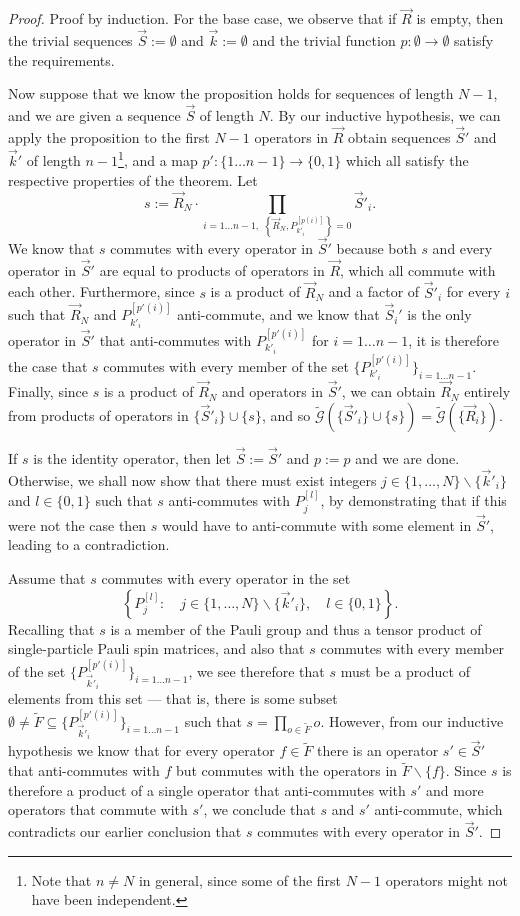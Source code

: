 \documentclass[12pt]{amsbook}
\theoremstyle{plain}
\theoremstyle{definition}
\theoremstyle{remark}
\newcommand{\lst}{\vec}
\newcommand{\set}{\tilde}
\newcommand{\genfun}{\tilde{\mathcal{G}}}
\newcommand{\paren}[1]{\left(#1\right)}
\begin{document}
\begin{proof}
Proof by induction.  For the base case, we observe that if $\lst R$ is empty, then the trivial sequences $\lst S:=\emptyset$ and $\lst k :=\emptyset$ and the trivial function $p:\emptyset\to\emptyset$ satisfy the requirements.

Now suppose that we know the proposition holds for sequences of length $N-1$, and we are given a sequence $\lst S$ of length $N$.  By our inductive hypothesis, we can apply the proposition to the first $N-1$ operators in $\lst R$ obtain sequences $\lst S'$ and $\lst k'$ of length $n-1$\footnote{Note that $n\ne N$ in general, since some of the first $N-1$ operators might not have been independent.}, and a map $p':\{1\dots n-1\}\to \{0,1\}$ which all satisfy the respective properties of the theorem.  Let $$s:=\lst R_N\cdot \prod_{i=1\dots n-1, \,\,\left\{\lst R_N,P_{k'_i}^{[p(i)]}\right\}=0} \lst S'_i.$$  We know that $s$ commutes with every operator in $\lst S'$ because both $s$ and every operator in $\lst S'$ are equal to products of operators in $\lst R$, which all commute with each other.  Furthermore, since $s$ is a product of $\lst R_N$ and a factor of $\lst S'_i$ for every $i$ such that $\lst R_N$ and $P_{k'_i}^{[p'(i)]}$ anti-commute, and we know that $\lst S_i'$ is the only operator in $\lst S'$ that anti-commutes with $P_{k'_i}^{[p'(i)]}$ for $i=1\dots n-1$, it is therefore the case that $s$ commutes with every member of the set $\{P_{k'_i}^{[p'(i)]}\}_{i=1\dots n-1}$.  Finally, since $s$ is a product of $\lst R_N$ and operators in $\lst S'$, we can obtain $\lst R_N$ entirely from products of operators in $\{\lst S'_i\} \cup \{s\}$, and so $\genfun\paren{\{\lst S'_i\} \cup \{s\}}=\genfun\paren{\{\lst R_i\}}$.

If $s$ is the identity operator, then let $\lst S:=\lst S'$ and $p:=p$ and we are done.  Otherwise, we shall now show that there must exist integers $j\in\{1,\dots,N\}\backslash\{\lst k'_i\}$ and $l\in\{0,1\}$ such that $s$ anti-commutes with $P_{j}^{[l]}$, by demonstrating that if this were not the case then $s$ would have to anti-commute with some element in $\lst S'$, leading to a contradiction.

Assume that $s$ commutes with every operator in the set $$\left\{P_j^{[l]}:\quad j\in\{1,\dots,N\}\backslash\{\lst k'_i\}, \quad l\in\{0,1\}\right\}.$$  Recalling that $s$ is a member of the Pauli group and thus a tensor product of single-particle Pauli spin matrices, and also that $s$ commutes with every member of the set $\{P_{\lst k'_i}^{[p'(i)]}\}_{i=1\dots n-1}$, we see therefore that $s$ must be a product of elements from this set --- that is, there is some subset $\emptyset \ne \set F \subseteq \{P_{\lst k'_i}^{[p'(i)]}\}_{i=1\dots n-1}$ such that $s=\prod_{o\in \set F} o$.  However, from our inductive hypothesis we know that for every operator $f\in\set F$ there is an operator $s'\in\lst S'$ that anti-commutes with $f$ but commutes with the operators in $\set F\backslash\{f\}$.  Since $s$ is therefore a product of a single operator that anti-commutes with $s'$ and more operators that commute with $s'$, we conclude that $s$ and $s'$ anti-commute, which contradicts our earlier conclusion that $s$ commutes with every operator in $\lst S'$.


\end{proof}
\end{document}
